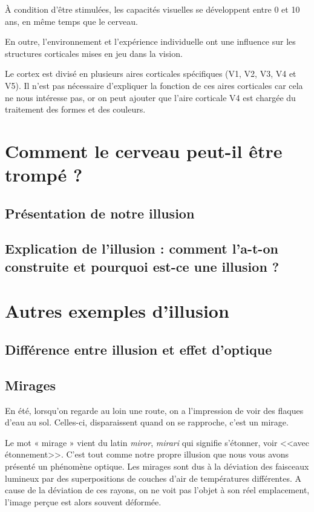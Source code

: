 \documentclass[a4paper, 12pt, onecolumn, openany]{report}
\begin{document}
	À condition d'être stimulées, les capacités visuelles se développent entre 0 et 10 ans, en même temps que le cerveau.
	
	En outre, l'environnement et l'expérience individuelle ont une influence sur les structures corticales mises en jeu dans la vision.
	
	Le cortex est divisé en plusieurs aires corticales spécifiques (V1, V2, V3, V4 et V5). Il n'est pas nécessaire d'expliquer la fonction de ces aires corticales car cela ne nous intéresse pas, or on peut ajouter que l'aire corticale V4 est chargée du traitement des formes et des couleurs.

\chapter{Comment le cerveau peut-il être trompé ?}
	\section{Présentation de notre illusion}
	\section{Explication de l'illusion : comment l'a-t-on construite et pourquoi est-ce une illusion ?}
\chapter{Autres exemples d'illusion}
	\section{Différence entre illusion et effet d'optique}
	\section{Mirages}
	En été, lorsqu’on regarde au loin une route, on a l’impression de voir des flaques d’eau au sol. Celles-ci, disparaissent quand on se rapproche, c’est un mirage. 
	
	Le mot « mirage » vient du latin \textit{miror}, \textit{mirari} qui signifie s’étonner, voir <<avec étonnement>>. C’est tout comme notre propre illusion que nous vous avons présenté un phénomène optique. Les mirages sont dus à la déviation des faisceaux lumineux par des superpositions de couches d’air de températures différentes.  
A cause de la déviation de ces rayons, on ne voit pas l’objet à son réel emplacement, l’image perçue est alors souvent déformée. 
	
\end{document}
